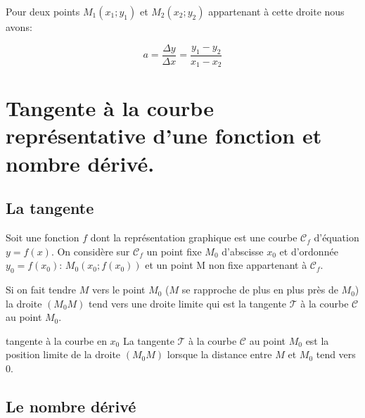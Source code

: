 \documentclass[a4paper,12pt]{scrartcl}
\begin{document}
Pour deux points $M_1(x_1;y_1)$ et $M_2(x_2;y_2)$ appartenant à cette droite nous avons:

\begin{equation*}
 a = \frac{\Delta y}{\Delta x} = \frac{y_1 - y_2}{x_1 - x_2}
\end{equation*}

\begin{center}

\end{center}


\begin{center}
\end{center}



\section{Tangente à la courbe représentative d'une fonction et nombre dérivé.}  

\subsection{La tangente}

Soit une fonction $f$ dont la représentation graphique est une courbe $\mathcal{C}_f$ d'équation $y  = f(x)$.
On considère sur $\mathcal{C}_f$ un point fixe $M_0$ d'abscisse $x_0$ et d'ordonnée $y_0 = f(x_0)$:  $M_0(x_0 ; f(x_0))$ et un point M non fixe appartenant à $\mathcal{C}_f$.

Si on fait tendre $M$ vers le point $M_0$ ($M$ se rapproche de plus en plus près de $M_0$) la droite $(M_0M)$ tend vers une droite limite qui est la tangente $\mathcal{T}$ à la courbe $\mathcal{C}$ au point $M_0$.

\begin{center}
 
\end{center}

\begin{definition}{tangente à la courbe en $x_0$}
La tangente $\mathcal{T}$ à la courbe $\mathcal{C}$ au point $M_0$ est la position limite de la droite $(M_0M)$ lorsque la distance entre $M$ et $M_0$ tend vers 0.
\end{definition}

\subsection{Le nombre dérivé}
\end{document}
